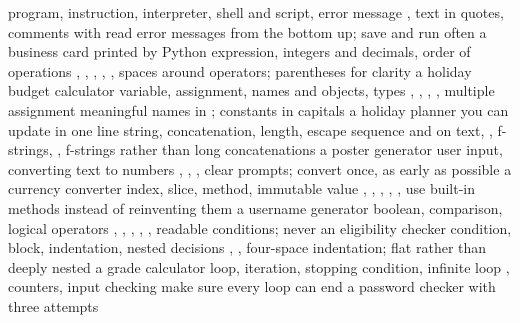   {program, instruction, interpreter, shell and script, error message}
  {, text in quotes, comments with \py{\#}}
  {read error messages from the bottom up; save and run often}
  {a business card printed by Python}
  {expression, integers and decimals, order of operations}
  {\py{+ - * /}, \py{// \% **}, , , , }
  {spaces around operators; parentheses for clarity}
  {a holiday budget calculator}
  {variable, assignment, names and objects, types}
  {\py{=}, \py{+=}, \py{-=}, , multiple assignment}
  {meaningful names in ; constants in capitals}
  {a holiday planner you can update in one line}
  {string, concatenation, length, escape sequence}
  {\py{+} and \py{*} on text, , f-strings, , }
  {f-strings rather than long concatenations}
  {a poster generator}
  {user input, converting text to numbers}
  {, , , }
  {clear prompts; convert once, as early as possible}
  {a currency converter}
  {index, slice, method, immutable value}
  {, , , , , }
  {use built-in methods instead of reinventing them}
  {a username generator}
  {boolean, comparison, logical operators}
  {, , \py{== != < >}, , , }
  {readable conditions; never }
  {an eligibility checker}
  {condition, block, indentation, nested decisions}
  {, , }
  {four-space indentation; flat rather than deeply nested}
  {a grade calculator}
  {loop, iteration, stopping condition, infinite loop}
  {, counters, input checking}
  {make sure every loop can end}
  {a password checker with three attempts}
